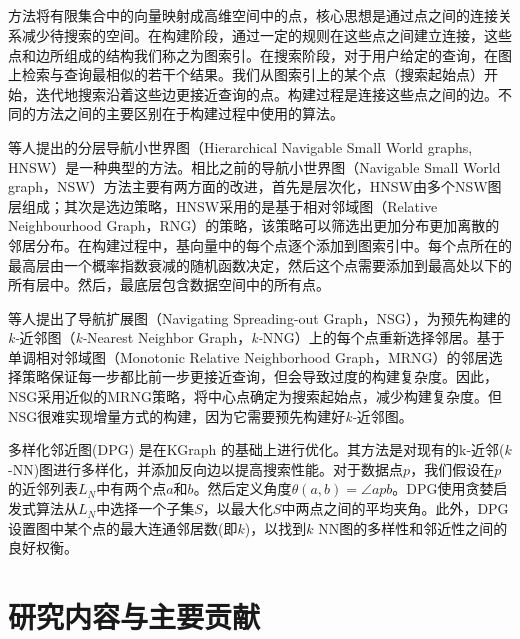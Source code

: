 \subsection{\ganns}
\ganns 方法将有限集合中的向量映射成高维空间中的点，核心思想是通过点之间的连接关系减少待搜索的空间。在构建阶段，通过一定的规则在这些点之间建立连接，这些点和边所组成的结构我们称之为图索引。在搜索阶段，对于用户给定的查询，在图上检索与查询最相似的若干个结果。我们从图索引上的某个点（搜索起始点）开始，迭代地搜索沿着这些边更接近查询的点。构建过程是连接这些点之间的边。不同的\ganns 方法之间的主要区别在于构建过程中使用的算法。

\citet{hnsw-2018}等人提出的分层导航小世界图（Hierarchical Navigable Small World graphs, HNSW）是一种典型的\ganns 方法。相比之前的导航小世界图\cite{nsw-2014}（Navigable Small World graph，NSW）方法主要有两方面的改进，首先是层次化，HNSW由多个NSW图层组成；其次是选边策略，HNSW采用的是基于相对邻域图\cite{rng-1980}（Relative Neighbourhood Graph，RNG）的策略，该策略可以筛选出更加分布更加离散的邻居分布。在构建过程中，基向量中的每个点逐个添加到图索引中。每个点所在的最高层由一个概率指数衰减的随机函数决定，然后这个点需要添加到最高处以下的所有层中。然后，最底层包含数据空间中的所有点。

\citet{nsg-2019}等人提出了导航扩展图（Navigating Spreading-out Graph，NSG），为预先构建的\textit{k-}近邻图（\textit{k-}Nearest Neighbor Graph，\textit{k-}NNG）上的每个点重新选择邻居。基于单调相对邻域图（Monotonic Relative Neighborhood Graph，MRNG）\cite{nsg-2019}的邻居选择策略保证每一步都比前一步更接近查询，但会导致过度的构建复杂度。因此，NSG采用近似的MRNG策略，将中心点确定为搜索起始点，减少构建复杂度。但NSG很难实现增量方式的构建，因为它需要预先构建好\textit{k-}近邻图。

多样化邻近图(DPG) \cite{dpg-2019}是在KGraph \cite{kgraph-2011}的基础上进行优化。其方法是对现有的k-近邻($k$-NN)图进行多样化，并添加反向边以提高搜索性能。对于数据点$p$，我们假设在$p$的近邻列表${L_N}$中有两个点$a$和$b$。然后定义角度$\theta (a,b) = \angle apb$。DPG使用贪婪启发式算法从${L_N}$中选择一个子集$S$，以最大化$S$中两点之间的平均夹角。此外，DPG设置图中某个点的最大连通邻居数(即$k$)，以找到$k$ NN图的多样性和邻近性之间的良好权衡。



\section{研究内容与主要贡献}

